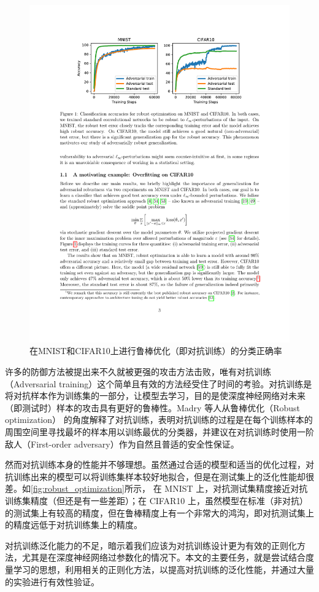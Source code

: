 \begin{figure}[h]
    \centering
    \includegraphics{fig/robust_optimization.pdf}
    \caption{在MNIST和CIFAR10上进行鲁棒优化（即对抗训练）的分类正确率}
    \label{fig:robust_optimization}
\end{figure}

许多的防御方法被提出来不久就被更强的攻击方法击败，唯有对抗训练（Adversarial training）这个简单且有效的方法经受住了时间的考验。对抗训练是将对抗样本作为训练集的一部分，让模型去学习，目的是使深度神经网络对未来（即测试时）样本的攻击具有更好的鲁棒性。Madry 等人\cite{madry2018towards}从鲁棒优化（Robust optimization） 的角度解释了对抗训练，表明对抗训练的过程是在每个训练样本的周围空间里寻找最坏的样本用以训练最优的分类器，并建议在对抗训练时使用一阶敌人（First-order adversary）作为自然且普适的安全性保证。

然而对抗训练本身的性能并不够理想。虽然通过合适的模型和适当的优化过程，对抗训练出来的模型可以将训练集样本较好地拟合，但是在测试集上的泛化性能却很差\cite{schmidt2018adversarially}。如\autoref{fig:robust_optimization}所示， 在 MNIST 上，对抗测试集精度接近对抗训练集精度（但还是有一些差距）；在 CIFAR10 上，虽然模型在标准（非对抗）的测试集上有较高的精度，但在鲁棒精度上有一个非常大的鸿沟，即对抗测试集上的精度远低于对抗训练集上的精度。

对抗训练泛化能力的不足，暗示着我们应该为对抗训练设计更为有效的正则化方法，尤其是在深度神经网络过参数化的情况下。本文的主要任务，就是尝试结合度量学习的思想，利用相关的正则化方法，以提高对抗训练的泛化性能，并通过大量的实验进行有效性验证。